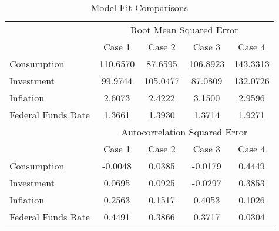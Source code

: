 \begin{table}
\caption{Model Fit Comparisons}\label{tb2:rmse}
\begin{center}
\begin{tabular}{|l|cccc|}\hline
 & \multicolumn{4}{|c|}{Root Mean Squared Error} \\ 
 & Case 1 & Case 2 & Case 3 & Case 4 \\ \hline
Consumption & 110.6570 & 87.6595 & 106.8923 & 143.3313 \\ 
Investment & 99.9744 & 105.0477 & 87.0809 & 132.0726 \\ 
Inflation & 2.6073 & 2.4222 & 3.1500 & 2.9596 \\ 
Federal Funds Rate & 1.3661 & 1.3930 & 1.3714 & 1.9271 \\ \hline 
 & \multicolumn{4}{|c|}{Autocorrelation Squared Error} \\ 
 & Case 1 & Case 2 & Case 3 & Case 4 \\ \hline
Consumption & -0.0048 & 0.0385 & -0.0179 & 0.4449 \\ 
Investment & 0.0695 & 0.0925 & -0.0297 & 0.3853 \\ 
Inflation & 0.2563 & 0.1517 & 0.4053 & 0.1026 \\ 
Federal Funds Rate & 0.4491 & 0.3866 & 0.3717 & 0.0304 \\ \hline 
\end{tabular}
\end{center}
\end{table}
